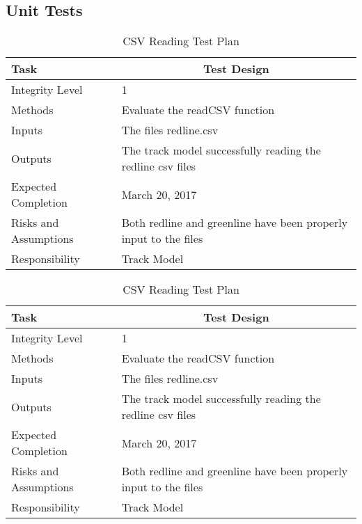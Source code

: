 \documentclass[]{article}
\begin{document}
\subsection{Unit Tests}
\begin{table}[H]
	\centering
	\caption{CSV Reading Test Plan}
	\begin{tabular}{|l|l|}
		\hline
		Task & \multicolumn{1}{c|}{Test Design} \\ \hline
		Integrity Level & 1 \\ \hline
		Methods & Evaluate the readCSV function\\ \hline
		Inputs &  The files redline.csv \\ \hline
		Outputs &  The track model successfully reading the redline csv files\\ \hline
		Expected Completion & March 20, 2017\\ \hline
		Risks and Assumptions & Both redline and greenline have been properly input to the files\\ \hline
		Responsibility & Track Model\\ \hline
	\end{tabular}
\end{table}
\begin{table}[H]
	\centering
	\caption{CSV Reading Test Plan}
	\begin{tabular}{|l|l|}
		\hline
		Task & \multicolumn{1}{c|}{Test Design} \\ \hline
		Integrity Level & 1 \\ \hline
		Methods & Evaluate the readCSV function\\ \hline
		Inputs &  The files redline.csv \\ \hline
		Outputs &  The track model successfully reading the redline csv files\\ \hline
		Expected Completion & March 20, 2017\\ \hline
		Risks and Assumptions & Both redline and greenline have been properly input to the files\\ \hline
		Responsibility & Track Model\\ \hline
	\end{tabular}
\end{table}
\end{document}
